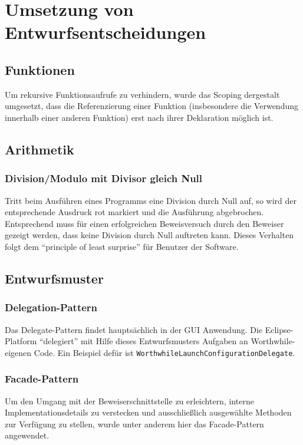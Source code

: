 \section{Umsetzung von Entwurfsentscheidungen}
\subsection{Funktionen}
Um rekursive Funktionsaufrufe zu verhindern, wurde das Scoping dergestalt umgesetzt, dass die Referenzierung einer Funktion (insbesondere die Verwendung innerhalb einer anderen Funktion) erst nach ihrer Deklaration möglich ist.

\subsection{Arithmetik}
\subsubsection{Division/Modulo mit Divisor gleich Null \label{umsetzung_division_null}}
Tritt beim Ausführen eines Programms eine Division durch Null auf, so wird der entsprechende Ausdruck rot markiert und die Ausführung abgebrochen. Entsprechend muss für einen erfolgreichen Beweisversuch durch den Beweiser gezeigt werden, dass keine Division durch Null auftreten kann. Dieses Verhalten folgt dem "`principle of least surprise"' für Benutzer der Software.

\subsection{Entwurfsmuster}
\subsubsection{Delegation-Pattern}
Das Delegate-Pattern findet hauptsächlich in der GUI Anwendung. Die Eclipse-Platform "`delegiert"' mit Hilfe dieses Entwurfsmusters Aufgaben an Worthwhile-eigenen Code. Ein Beispiel defür ist \texttt{WorthwhileLaunchConfigurationDelegate}.

\subsubsection{Facade-Pattern}
Um den Umgang mit der Beweiserschnittstelle zu erleichtern, interne Implementationsdetails zu verstecken und ausschließlich ausgewählte Methoden zur Verfügung zu stellen, wurde unter anderem hier das Facade-Pattern angewendet.


